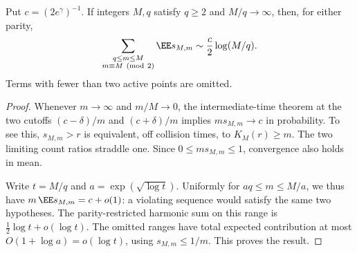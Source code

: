 \documentclass[11pt,letterpaper]{article}
\begin{document}
\begin{lemma}
\label{lem:truncated-matching-length}
Put $c=(2e^\gamma)^{-1}$. If integers $M,q$ satisfy $q\ge2$ and
$M/q\to\infty$, then, for either parity,
\begin{equation}\label{eq:truncated-matching-length}
 \sum_{\substack{q\le m\le M\\m\equiv M\ ({\rm mod}\ 2)}}
       \EE s_{M,m}
       \sim\frac c2\log(M/q).
\end{equation}
Terms with fewer than two active points are omitted.
\end{lemma}
\begin{proof}
Whenever $m\to\infty$ and $m/M\to0$, the intermediate-time theorem
at the two cutoffs $(c-\delta)/m$ and $(c+\delta)/m$ implies
$m s_{M,m}\to c$ in probability. To see this, $s_{M,m}>r$ is
equivalent, off collision times, to $K_M(r)\ge m$.
The two limiting count ratios straddle one. Since
$0\le m s_{M,m}\le1$, convergence also holds in mean.

Write $t=M/q$ and $a=\exp(\sqrt{\log t})$.
Uniformly for $aq\le m\le M/a$, we thus have
$m\,\EE s_{M,m}=c+o(1)$: a violating sequence would satisfy the
same two hypotheses. The parity-restricted harmonic sum on this
range is $\tfrac12\log t+o(\log t)$.
The omitted ranges have total expected contribution at most
$O(1+\log a)=o(\log t)$, using $s_{M,m}\le1/m$.
This proves the result.
\end{proof}
\end{document}
